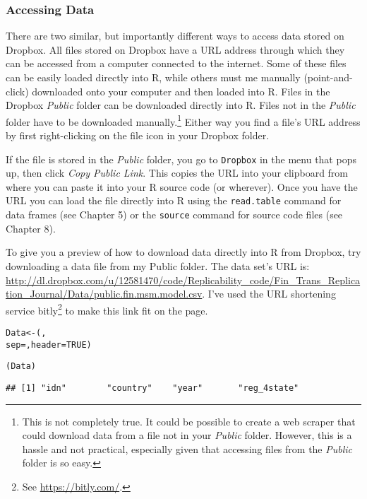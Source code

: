 \subsubsection{Accessing Data}

There are two similar, but importantly different ways to access data stored on Dropbox. All files stored on Dropbox have a URL address through which they can be accessed from a computer connected to the internet. Some of these files can be easily loaded directly into R, while others must me manually (point-and-click) downloaded onto your computer and then loaded into R. Files in the Dropbox \emph{Public} folder can be downloaded directly into R. Files not in the \emph{Public} folder have to be downloaded  manually.\footnote{This is not completely true. It could be possible to create a web scraper that could download data from a file not in your \emph{Public} folder. However, this is a hassle and not practical, especially given that accessing files from the \emph{Public} folder is so easy.} Either way you find a file's URL address by first right-clicking on the file icon in your Dropbox folder. 

If the file is stored in the \emph{Public} folder, you go to \texttt{Dropbox} in the menu that pops up, then click \emph{Copy Public Link}. This copies the URL into your clipboard from where you can paste it into your R source code (or wherever). Once you have the URL you can load the file directly into R using the \texttt{read.table} command for data frames (see Chapter 5) or the \texttt{source} command for source code files (see Chapter 8).

To give you a preview of how to download data directly into R from Dropbox, try downloading a data file from my Public folder. The data set's URL is: \url{http://dl.dropbox.com/u/12581470/code/Replicability_code/Fin_Trans_Replication_Journal/Data/public.fin.msm.model.csv}. I've used the URL shortening service bitly\footnote{See \url{https://bitly.com/}.} to make this link fit on the page.

\begin{knitrout}
\color{fgcolor}\begin{kframe}
\begin{alltt}
Data <- (, 
                    sep = , header = TRUE)
                    
(Data)
\end{alltt}
\begin{verbatim}
## [1] "idn"        "country"    "year"       "reg_4state"
\end{verbatim}
\end{kframe}
\end{knitrout}


